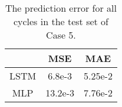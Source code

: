 \begin{table}[ht!]
    \centering
    \caption{The prediction error for all cycles in the test set of Case 5.}
    \begin{tabular}{c | c c}
                    & \ac{MSE}  & \ac{MAE}  \\ \hline
        \ac{LSTM}   & 6.8e-3         & 5.25e-2         \\
        \ac{MLP}    & 13.2e-3         & 7.76e-2
    \end{tabular}
    \label{tab:case5-test-eval}
\end{table}